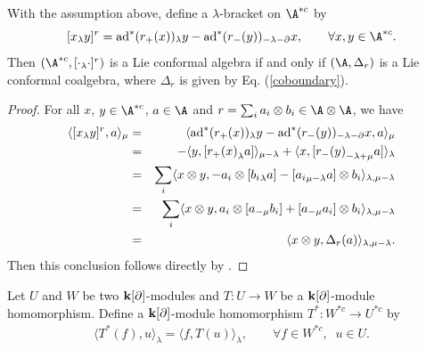\documentclass[12pt]{amsart}
\begin{document}
\begin{proposition}\label{prop-1}
With the assumption above, define a $\lambda$-bracket on $\A^{*c}$ by
\begin{equation}\label{acl}
    [x_\lambda y]^r={\rm ad}^*(r_+(x))_\lambda y-{\rm ad}^*(r_-(y))_{-\lambda-\partial}x,\qquad   \forall x,y\in \A^{*c}.
\end{equation}
Then $(\A^{*c},[\cdot_\lambda\cdot]^r)$ is a Lie conformal algebra if and only if $(\A, \Delta_r)$ is a Lie conformal coalgebra, where $\Delta_r$ is given by Eq. (\ref{coboundary}).
\end{proposition}
\begin{proof}
For all $x$, $y\in \A^{*c}$, $a\in \A$ and $r=\sum_i a_i\otimes b_i\in\A\otimes \A$, we have
\begin{eqnarray*}
    \langle [x_\lambda y]^r,a \rangle_\mu&=&\langle {\rm ad}^*(r_+(x))_\lambda y-{\rm ad}^*(r_-(y))_{-\lambda-\partial}x,a\rangle_\mu\\
    &=&-\langle y, [{r_+(x)}_\lambda a]\rangle_{\mu-\lambda}+\langle x, [{r_-(y)}_{-\lambda+\mu} a]\rangle_\lambda\\
    &=&\sum_i\langle  x\otimes y,-a_i\otimes [{b_i}_{\lambda}a ]-[{a_i}_{\mu-\lambda}a]\otimes b_i\rangle_{\lambda,\mu-\lambda}\\
    &=&\sum_i\langle  x\otimes y,a_i\otimes [a_{-\mu}b_i]+[a_{-\mu}a_i]\otimes b_i\rangle_{\lambda,\mu-\lambda}\\
    &=&\langle x\otimes y,\Delta_r(a)\rangle_{\lambda,\mu-\lambda}.
\end{eqnarray*}
Then this conclusion follows directly by
\cite[Proposition 2.13]{L}.
\end{proof}

Let $U$ and $W$ be two ${\bf k}[\partial]$-modules and $T: U\rightarrow W$ be a ${\bf k}[\partial]$-module homomorphism. Define a ${\bf k}[\partial]$-module homomorphism $T^\ast: W^{\ast c}\rightarrow U^{\ast c}$ by
\begin{eqnarray*}
\langle T^{\ast}(f),u\rangle_\lambda=\langle f, T(u)\rangle_\lambda,\qquad  \forall f\in  W^{\ast c},\;\;u\in U.
\end{eqnarray*}
\end{document}

